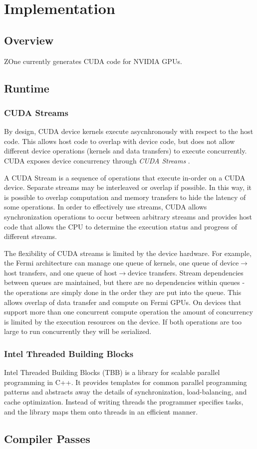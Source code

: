 \section*{Implementation}

\subsection*{Overview}

ZOne currently generates CUDA code for NVIDIA GPUs.

\subsection*{Runtime}

\subsubsection*{CUDA Streams}
By design, CUDA device kernels execute asycnhronously with respect to the
host code. This allows host code to overlap with device code, but does not
allow different device operations (kernels and data transfers) to execute
concurrently. CUDA exposes device concurrency through \textit{CUDA Streams}
\cite{kirk2012programming}.

A CUDA Stream is a sequence of operations that
execute in-order on a CUDA device. Separate streams may be interleaved or
overlap if possible. In this way, it is possible to overlap computation and
memory transfers to hide the latency of some operations.
In order to effectively use streams, CUDA allows synchronization operations
to occur between arbitrary streams and provides host code that allows the
CPU to determine the execution status and progress of different streams.

The flexibility of CUDA streams is limited by the device hardware.
For example, the Fermi architecture can manage one queue of kernels, one queue
of device$\rightarrow$host transfers, and one queue of host$\rightarrow$device
transfers. Stream
dependencies between queues are maintained, but there are no dependencies
within queues - the operations are simply done in the order they are put into
the queue. This allows overlap of data transfer and compute on Fermi GPUs.
On devices that support more than one concurrent compute operation the amount
of concurrency is limited by the execution resources on the device. If both
operations are too large to run concurrently they will be serialized.

\subsubsection*{Intel Threaded Building Blocks}
Intel Threaded Building Blocks \cite{reinders2007intel} (TBB) is a library for
scalable parallel
programming in C++. It provides templates for common parallel programming
patterns and abstracts away the details of synchronization, load-balancing,
and cache optimization. Instead of writing threads the programmer specifies
tasks, and the library maps them onto threads in an efficient manner.


\subsection*{Compiler Passes}

